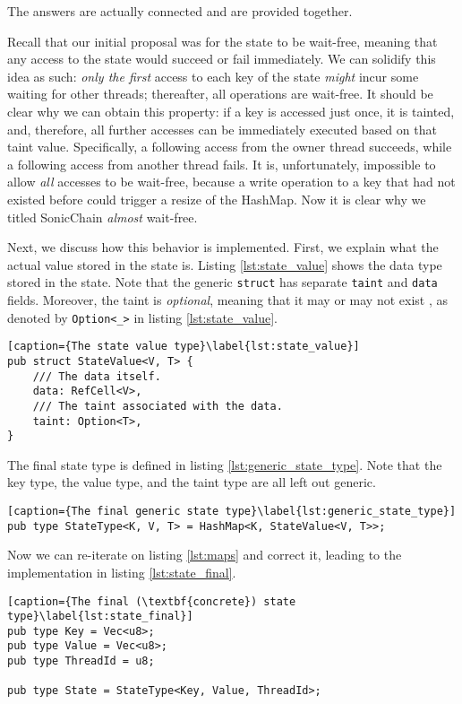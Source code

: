 The answers are actually connected and are provided together.

Recall that our initial proposal was for the state to be wait-free, meaning that any access to the
state would succeed or fail immediately. We can solidify this idea as such: \textit{only the first}
access to each key of the state \textit{might} incur some waiting for other threads; thereafter, all
operations are wait-free. It should be clear why we can obtain this property: if a key is accessed
just once, it is tainted, and, therefore, all further accesses can be immediately executed based on
that taint value. Specifically, a following access from the owner thread succeeds, while a following
access from another thread fails. It is, unfortunately, impossible to allow \textit{all} accesses to
be wait-free, because a write operation to a key that had not existed before could trigger a resize
of the HashMap. Now it is clear why we titled SonicChain \textit{almost} wait-free.

Next, we discuss how this behavior is implemented. First, we explain what the actual value stored in
the state is. Listing \ref{lst:state_value} shows the data type stored in the state. Note that the
generic \texttt{struct} has separate \texttt{taint} and \texttt{data} fields. Moreover, the taint is
\textit{optional}, meaning that it may or may not exist , as denoted by \texttt{Option<\_>} in listing \ref{lst:state_value}.

\begin{lstlisting}[caption={The state value type}\label{lst:state_value}]
pub struct StateValue<V, T> {
	/// The data itself.
	data: RefCell<V>,
	/// The taint associated with the data.
	taint: Option<T>,
}
\end{lstlisting}

The final state type is defined in listing \ref{lst:generic_state_type}. Note that the key type, the value
type, and the taint type are all left out generic.

\begin{lstlisting}[caption={The final generic state type}\label{lst:generic_state_type}]
pub type StateType<K, V, T> = HashMap<K, StateValue<V, T>>;
\end{lstlisting}

Now we can re-iterate on listing \ref{lst:maps} and correct it, leading to the implementation in
listing \ref{lst:state_final}.

\begin{lstlisting}[caption={The final (\textbf{concrete}) state type}\label{lst:state_final}]
pub type Key = Vec<u8>;
pub type Value = Vec<u8>;
pub type ThreadId = u8;

pub type State = StateType<Key, Value, ThreadId>;
\end{lstlisting}

